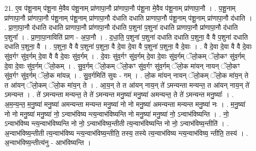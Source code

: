 \documentclass[17pt]{extarticle}
\begin{document}
21. ए॒व प॑शू॒नाम् प॑शू॒ना मे॒वैव प॑शू॒नाम् प्रा॑णापा॒नौ प्रा॑णापा॒नौ प॑शू॒ना मे॒वैव प॑शू॒नाम् प्रा॑णापा॒नौ । . प॒शू॒नाम् प्रा॑णापा॒नौ प्रा॑णापा॒नौ प॑शू॒नाम् प॑शू॒नाम् प्रा॑णापा॒नौ द॑धाति दधाति प्राणापा॒नौ प॑शू॒नाम् प॑शू॒नाम् प्रा॑णापा॒नौ द॑धाति । . प्रा॒णा॒पा॒नौ द॑धाति दधाति प्राणापा॒नौ प्रा॑णापा॒नौ द॑धाति प॒शुना॑ प॒शुना॑ दधाति प्राणापा॒नौ प्रा॑णापा॒नौ द॑धाति प॒शुना᳚ । . प्रा॒णा॒पा॒नाविति॑ प्राण - अ॒पा॒नौ । . द॒धा॒ति॒ प॒शुना॑ प॒शुना॑ दधाति दधाति प॒शुना॒ वै वै प॒शुना॑ दधाति दधाति प॒शुना॒ वै । . प॒शुना॒ वै वै प॒शुना॑ प॒शुना॒ वै दे॒वा दे॒वा वै प॒शुना॑ प॒शुना॒ वै दे॒वाः । . वै दे॒वा दे॒वा वै वै दे॒वाः सु॑व॒र्गꣳ सु॑व॒र्गम् दे॒वा वै वै दे॒वाः सु॑व॒र्गम् । . दे॒वाः सु॑व॒र्गꣳ सु॑व॒र्गम् दे॒वा दे॒वाः सु॑व॒र्गम् ॅलो॒कम् ॅलो॒कꣳ सु॑व॒र्गम् दे॒वा दे॒वाः सु॑व॒र्गम् ॅलो॒कम् । . सु॒व॒र्गम् ॅलो॒कम् ॅलो॒कꣳ सु॑व॒र्गꣳ सु॑व॒र्गम् ॅलो॒क मा॑यन् नायन् ॅलो॒कꣳ सु॑व॒र्गꣳ सु॑व॒र्गम् ॅलो॒क मा॑यन्न् । . सु॒व॒र्गमिति॑ सुवः - गम् । . लो॒क मा॑यन् नायन् ॅलो॒कम् ॅलो॒क मा॑य॒न् ते त आ॑यन् ॅलो॒कम् ॅलो॒क मा॑य॒न् ते । . आ॒य॒न् ते त आ॑यन् नाय॒न् ते॑ ऽमन्यन्ता मन्यन्त॒ त आ॑यन् नाय॒न् ते॑ ऽमन्यन्त । . ते॑ ऽमन्यन्ता मन्यन्त॒ ते ते॑ ऽमन्यन्त मनु॒ष्या॑ मनु॒ष्या॑ अमन्यन्त॒ ते ते॑ ऽमन्यन्त मनु॒ष्याः᳚ । . अ॒म॒न्य॒न्त॒ म॒नु॒ष्या॑ मनु॒ष्या॑ अमन्यन्ता मन्यन्त मनु॒ष्या॑ नो नो मनु॒ष्या॑ अमन्यन्ता मन्यन्त मनु॒ष्या॑ नः । . म॒नु॒ष्या॑ नो नो मनु॒ष्या॑ मनु॒ष्या॑ नो॒ ऽन्वाभ॑विष्य न्त्य॒न्वाभ॑विष्यन्ति नो मनु॒ष्या॑ मनु॒ष्या॑ नो॒ ऽन्वाभ॑विष्यन्ति । . नो॒ ऽन्वाभ॑विष्य न्त्य॒न्वाभ॑विष्यन्ति नो नो॒ ऽन्वाभ॑विष्य॒न्तीती त्य॒न्वाभ॑विष्यन्ति नो नो॒ ऽन्वाभ॑विष्य॒न्तीति॑ । . अ॒न्वाभ॑विष्य॒न्तीती त्य॒न्वाभ॑विष्य न्त्य॒न्वाभ॑विष्य॒न्तीति॒ तस्य॒ तस्ये त्य॒न्वाभ॑विष्य न्त्य॒न्वाभ॑विष्य॒
न्तीति॒ तस्य॑ । . अ॒न्वाभ॑विष्य॒न्तीत्य॑नु - आभ॑विष्यन्ति । \newline
\end{document}
